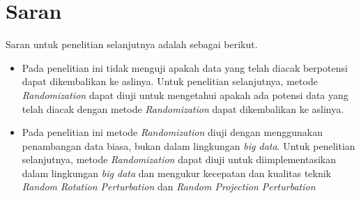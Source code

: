 \section{Saran}
\label{sec:saran}

Saran untuk penelitian selanjutnya adalah sebagai berikut.
\begin{itemize}
    \item Pada penelitian ini tidak menguji apakah data yang telah diacak berpotensi dapat dikembalikan ke aslinya. Untuk penelitian selanjutnya, metode \textit{Randomization} dapat diuji untuk mengetahui apakah ada potensi data yang telah diacak dengan metode \textit{Randomization} dapat dikembalikan ke aslinya.
    \item Pada penelitian ini metode \textit{Randomization} diuji dengan menggunakan penambangan data biasa, bukan dalam lingkungan \textit{big data}. Untuk penelitian selanjutnya, metode \textit{Randomization} dapat diuji untuk diimplementasikan dalam lingkungan \textit{big data} dan mengukur kecepatan dan kualitas teknik \textit{Random Rotation Perturbation} dan \textit{Random Projection Perturbation}
\end{itemize}

